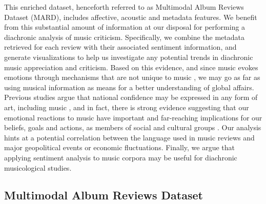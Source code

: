 This enriched dataset, henceforth referred to as Multimodal Album Reviews Dataset (MARD), includes affective, acoustic and metadata features. %
We benefit from this substantial amount of information at our disposal for performing a diachronic analysis of music criticism. Specifically, we combine the metadata retrieved for each review with their associated sentiment information, and generate visualizations to help us investigate any potential trends in diachronic music appreciation and criticism. Based on this evidence, and since music evokes emotions through mechanisms that are not unique to music \cite{Juslin2008}, we may go as far as using musical information as means for a better understanding of global affairs. Previous studies argue that national confidence may be expressed in any form of art, including music \cite{Moisi2010}, and in fact, there is strong evidence suggesting that our emotional reactions to music have important and far-reaching implications for our beliefs, goals and actions, as members of social and cultural groups \cite{Alcorta2008}. Our analysis hints at a potential correlation between the language used in music reviews and major geopolitical events or economic fluctuations. Finally, we argue that applying sentiment analysis to music corpora may be useful for diachronic musicological studies.


\subsection{Multimodal Album Reviews Dataset}\label{sec:dataset}

